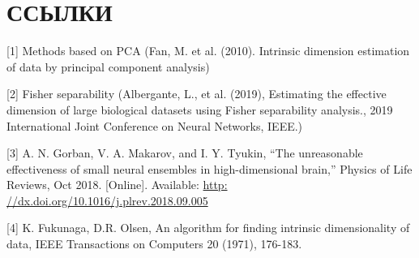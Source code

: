 \documentclass[english, russian]{sobraep}
\begin{document}
\section{ССЫЛКИ}
[1] Methods based on PCA (Fan, M. et al. (2010). Intrinsic dimension estimation of data by principal component analysis)

[2] Fisher separability (Albergante, L., et al. (2019), Estimating the effective dimension of large biological datasets using Fisher separability analysis., 2019 International Joint Conference on Neural Networks, IEEE.)

[3] A. N. Gorban, V. A. Makarov, and I. Y. Tyukin, “The unreasonable
effectiveness of small neural ensembles in high-dimensional brain,”
Physics of Life Reviews, Oct 2018. [Online]. Available: \url{http:
//dx.doi.org/10.1016/j.plrev.2018.09.005}

[4] K. Fukunaga, D.R. Olsen, An algorithm for finding intrinsic
dimensionality of data, IEEE Transactions on Computers 20
(1971), 176-183.
\end{document}
